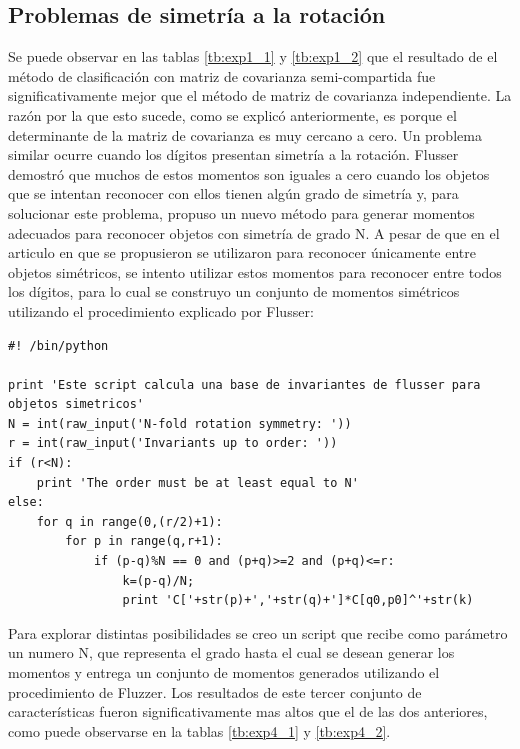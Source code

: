 \documentclass[a4paper, 11pt, oneside]{report}
\newenvironment{mylisting}
{\begin{list}{}{\setlength{\leftmargin}{1em}}\item\scriptsize\bfseries}
{\end{list}}
\begin{document}
\subsection{Problemas de simetría a la rotación}

Se puede observar en las tablas \ref{tb:exp1_1} y \ref{tb:exp1_2} que el resultado de el método de clasificación con matriz de covarianza semi-compartida fue significativamente mejor que el método de matriz de covarianza independiente. La razón por la que esto sucede, como se explicó anteriormente, es porque el determinante de la matriz de covarianza es muy cercano a cero. Un problema similar ocurre cuando los dígitos presentan simetría a la rotación. Flusser\cite{flusser06} demostró que muchos de estos momentos son iguales a cero cuando los objetos que se intentan reconocer con ellos tienen algún grado de simetría y, para solucionar este problema, propuso un nuevo método para generar momentos adecuados para reconocer objetos con simetría de grado N. A pesar de que en el articulo en que se propusieron se utilizaron para reconocer únicamente entre objetos simétricos, se intento utilizar estos momentos para reconocer entre todos los dígitos, para lo cual se construyo un conjunto de momentos simétricos utilizando el procedimiento explicado por Flusser:

\begin{mylisting}
\begin{verbatim}
#! /bin/python

print 'Este script calcula una base de invariantes de flusser para objetos simetricos'
N = int(raw_input('N-fold rotation symmetry: '))
r = int(raw_input('Invariants up to order: '))
if (r<N):
    print 'The order must be at least equal to N'
else:
    for q in range(0,(r/2)+1):
        for p in range(q,r+1):
            if (p-q)%N == 0 and (p+q)>=2 and (p+q)<=r:
                k=(p-q)/N;
                print 'C['+str(p)+','+str(q)+']*C[q0,p0]^'+str(k) 
\end{verbatim}
\end{mylisting}

Para explorar distintas posibilidades se creo un script que recibe como parámetro un numero N, que representa el grado hasta el cual se desean generar los momentos y entrega un conjunto de momentos generados utilizando el procedimiento de Fluzzer. Los resultados de este tercer conjunto de características fueron significativamente mas altos que el de las dos anteriores, como puede observarse en la tablas \ref{tb:exp4_1} y \ref{tb:exp4_2}.
\end{document}
